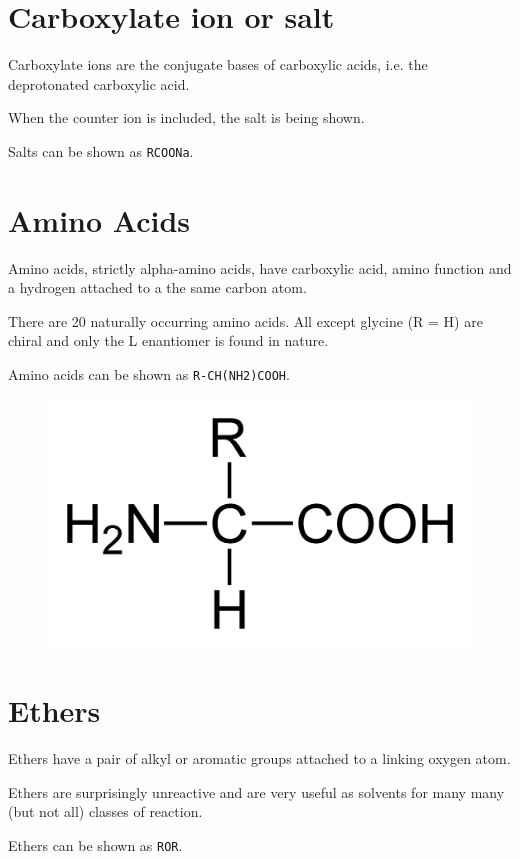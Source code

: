 \documentclass[oneside]{book} %
\theoremstyle{plain}
\begin{document}
\section{Carboxylate ion or salt}
Carboxylate ions are the conjugate bases of carboxylic acids, i.e. the
deprotonated carboxylic acid.

When the counter ion is included, the salt is being shown.

Salts can be shown as \texttt{RCOONa}.

\section{Amino Acids}
Amino acids, strictly alpha-amino acids, have carboxylic acid, amino function
and a hydrogen attached to a the same carbon atom.

There are 20 naturally occurring amino acids. All except glycine (R = H) are
chiral and only the L enantiomer is found in nature.

Amino acids can be shown as \texttt{R-CH(NH2)COOH}.

\begin{figure}[ht]
\includegraphics[scale=0.125]{alpha-amino-acid-flat.png}
\centering
\end{figure}

\section{Ethers}
Ethers have a pair of alkyl or aromatic groups attached to a linking oxygen
atom.

Ethers are surprisingly unreactive and are very useful as solvents for many many
(but not all) classes of reaction.

Ethers can be shown as \texttt{ROR}.
\end{document}
